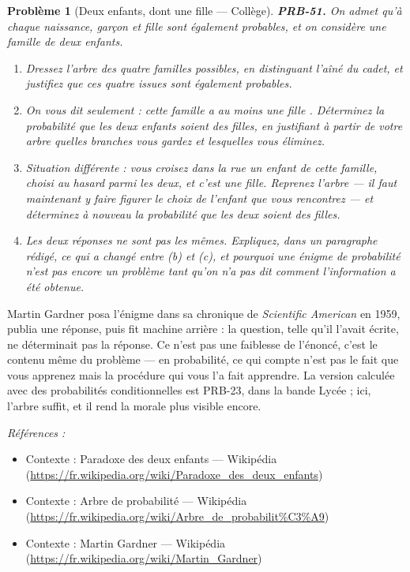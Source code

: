 \documentclass[11pt]{article}
\newtheorem{problem}{Problème}
\newenvironment{refs}{\par\small\noindent\emph{Références :}\begin{itemize}\setlength\itemsep{0pt}}{\end{itemize}\normalsize}
\begin{document}
\bigskip

\begin{problem}[{Deux enfants, dont une fille --- Collège}]
\textbf{PRB-51.} On admet qu'à chaque naissance, garçon et fille sont également probables, et
on considère une famille de deux enfants.
\begin{enumerate}
\item[(a)] Dressez l'arbre des quatre familles possibles, en distinguant l'aîné du cadet, et justifiez
que ces quatre issues sont également probables.
\item[(b)] On vous dit seulement : \og{} cette famille a au moins une fille \fg{}. Déterminez la probabilité que
les deux enfants soient des filles, en justifiant à partir de votre arbre quelles branches vous
gardez et lesquelles vous éliminez.
\item[(c)] Situation différente : vous croisez dans la rue un enfant de cette famille, choisi au hasard
parmi les deux, et c'est une fille. Reprenez l'arbre --- il faut maintenant y faire figurer le choix
de l'enfant que vous rencontrez --- et déterminez à nouveau la probabilité que les deux soient des
filles.
\item[(d)] Les deux réponses ne sont pas les mêmes. Expliquez, dans un paragraphe rédigé, ce qui a changé
entre (b) et (c), et pourquoi une énigme de probabilité n'est pas encore un problème tant qu'on n'a
pas dit \textit{comment} l'information a été obtenue.
\end{enumerate}

\end{problem}

\noindent Martin Gardner posa l'énigme dans sa chronique de \textit{Scientific American} en
1959, publia une réponse, puis fit machine arrière : la question, telle qu'il l'avait écrite, ne
déterminait pas la réponse. Ce n'est pas une faiblesse de l'énoncé, c'est le contenu même du
problème --- en probabilité, ce qui compte n'est pas le fait que vous apprenez mais la procédure qui
vous l'a fait apprendre. La version calculée avec des probabilités conditionnelles est PRB-23,
dans la bande Lycée ; ici, l'arbre suffit, et il rend la morale plus visible encore.

\begin{refs}
\item Contexte : Paradoxe des deux enfants --- Wikipédia (\url{https://fr.wikipedia.org/wiki/Paradoxe_des_deux_enfants})
\item Contexte : Arbre de probabilité --- Wikipédia (\url{https://fr.wikipedia.org/wiki/Arbre_de_probabilit%C3%A9})
\item Contexte : Martin Gardner --- Wikipédia (\url{https://fr.wikipedia.org/wiki/Martin_Gardner})
\end{refs}
\end{document}
